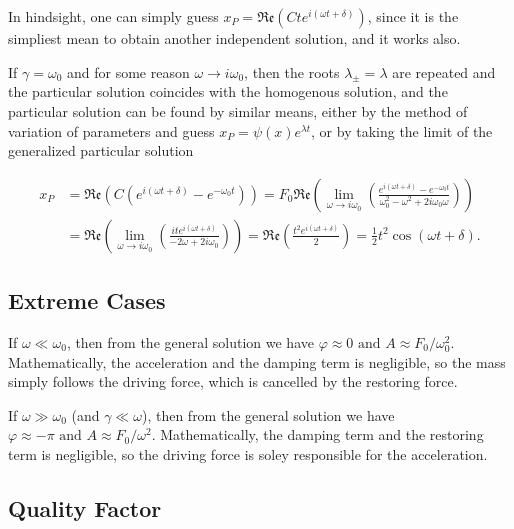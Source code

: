 \documentclass[english,a4paper,12pt]{report}
\begin{document}
In hindsight, one can simply guess \(x_{P} = \mathfrak{Re} (Cte^{i(\omega t+\delta )} )  \), since it is the simpliest mean to obtain another independent solution, and it works also. 

If \(\gamma = \omega _{0} \) and for some reason \(\omega \to i\omega _{0}\), then the roots \(\lambda _{\pm } = \lambda  \) are repeated and the particular solution coincides with the homogenous solution, and the particular solution can be found by similar means, either by the method of variation of parameters and guess \(x_{P} = \psi (x)e^{\lambda t}  \), or by taking the limit of the generalized particular solution

\begin{equation}
    \begin{aligned} 
    x_{P} &= \mathfrak{Re} (C(e^{i(\omega t+\delta )} - e^{-\omega _{0}t } )) = F_0 \mathfrak{Re} \left( \lim_{\omega  \to i\omega _{0} } \left( \frac{e^{i(\omega t+\delta )}-e^{-\omega _{0}t }  }{\omega _{0}^2-\omega ^2+2i\omega _{0}\omega  }  \right) \right) \\ &= \mathfrak{Re} \left( \lim_{\omega  \to i\omega _{0} } \left( \frac{ite^{i(\omega t+\delta )} }{-2\omega + 2i\omega _{0} }  \right) \right) = \mathfrak{Re} \left( \frac{t^2 e^{i(\omega t+\delta )} }{2}  \right) = \frac{1}{2}t^2\cos (\omega t+\delta ). 
    \end{aligned} 
\end{equation}

\subsection{Extreme Cases}

If \(\omega \ll \omega _{0} \), then from the general solution we have \(\varphi \approx 0 \text { and } A \approx F_0 /\omega _{0}^2  \). Mathematically, the acceleration and the damping term is negligible, so the mass simply follows the driving force, which is cancelled by the restoring force. 

If \(\omega \gg \omega _{0}\) (and \(\gamma \ll \omega \)), then from the general solution we have \( \varphi \approx -\pi \text { and } A \approx F_0 /\omega ^2  \). Mathematically, the damping term and the restoring term is negligible, so the driving force is soley responsible for the acceleration.

\subsection{Quality Factor}
\end{document}
